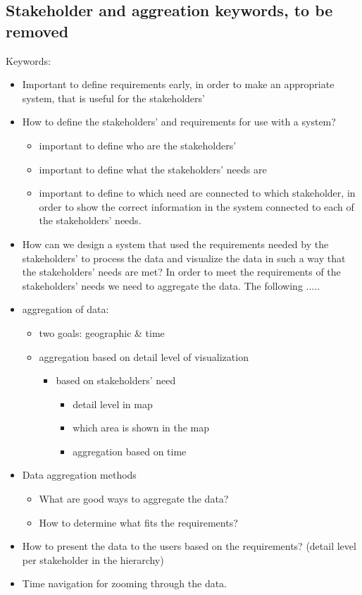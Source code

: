 \subsection{Stakeholder and aggreation keywords, to be removed} %
\label{sub:stakeholder_and_aggreation_keywords}
Keywords:

\begin{itemize}
	\item Important to define requirements early, in order to make an appropriate system, that is useful for the stakeholders'
	\item How to define the stakeholders' and requirements for use with a system?
	\begin{itemize}
		\item important to define who are the stakeholders'
		\item important to define what the stakeholders' needs are
		\item important to define to which need are connected to which stakeholder, in order to show the correct information in the system connected to each of the stakeholders' needs.
	\end{itemize}
	\item How can we design a system that used the requirements needed by the stakeholders' to process the data and visualize the data in such a way that the stakeholders' needs are met?
	In order to meet the requirements of the stakeholders' needs we need to aggregate the data. The following .....
	\item aggregation of data:
	\begin{itemize}
		\item two goals: geographic \& time
		\item aggregation based on detail level of visualization
		\begin{itemize}
			\item based on stakeholders' need
			\begin{itemize}
				\item detail level in map
				\item which area is shown in the map
				\item aggregation based on time
			\end{itemize}
		\end{itemize}
	\end{itemize}
	\item Data aggregation methods
	\begin{itemize}
		\item What are good ways to aggregate the data?
		\item How to determine what fits the requirements?
	\end{itemize}
	\item How to present the data to the users based on the requirements? (detail
	level per stakeholder in the hierarchy)
	\item Time navigation for zooming through the data.
\end{itemize}

